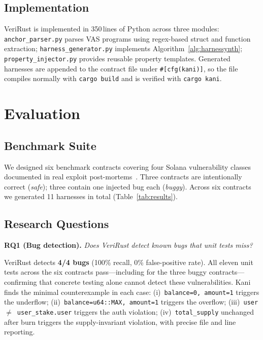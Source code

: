 \documentclass[sigconf,review,anonymous]{acmart}
\begin{document}
\subsection{Implementation}

VeriRust is implemented in 350\,lines of Python across three modules:
\texttt{anchor\_parser.py} parses VAS programs using regex-based
struct and function extraction;
\texttt{harness\_generator.py} implements
Algorithm~\ref{alg:harnessynth};
\texttt{property\_injector.py} provides reusable property templates.
Generated harnesses are appended to the contract file under
\texttt{\#[cfg(kani)]}, so the file compiles normally with
\texttt{cargo build} and is verified with \texttt{cargo kani}.

\section{Evaluation}
\label{sec:eval}

\subsection{Benchmark Suite}

We designed six benchmark contracts covering four Solana
vulnerability classes documented in real exploit
post-mortems~\cite{wormhole2022,soteria2021}.
Three contracts are intentionally correct (\emph{safe}); three
contain one injected bug each (\emph{buggy}).
Across six contracts we generated 11 harnesses in total
(Table~\ref{tab:results}).

\subsection{Research Questions}

\noindent\textbf{RQ1 (Bug detection).}
\emph{Does VeriRust detect known bugs that unit tests miss?}

VeriRust detects \textbf{4/4 bugs} (100\% recall, 0\% false-positive
rate).
All eleven unit tests across the six contracts pass---including for
the three buggy contracts---confirming that concrete testing alone
cannot detect these vulnerabilities.
Kani finds the minimal counterexample in each case:
(i)~\texttt{balance=0, amount=1} triggers the underflow;
(ii)~\texttt{balance=u64::MAX, amount=1} triggers the overflow;
(iii)~\texttt{user $\neq$ user\_stake.user} triggers the auth
violation;
(iv)~\texttt{total\_supply} unchanged after burn triggers the
supply-invariant violation, with precise file and line reporting.
\end{document}
